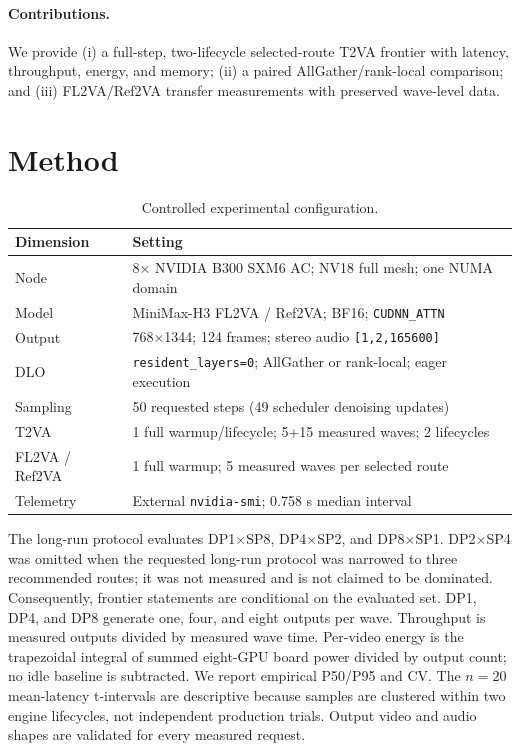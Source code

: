 \documentclass[10pt]{article}
\begin{document}
\paragraph{Contributions.}
We provide (i) a full-step, two-lifecycle selected-route T2VA frontier with
latency, throughput, energy, and memory; (ii) a paired AllGather/rank-local comparison;
and (iii) FL2VA/Ref2VA transfer measurements with preserved wave-level data.

\section{Method}

\begin{table}[ht]
\centering
\caption{Controlled experimental configuration.}
\label{tab:setup}
\small
\begin{tabular}{@{}ll@{}}
\toprule
Dimension & Setting \\
\midrule
Node & 8$\times$ NVIDIA B300 SXM6 AC; NV18 full mesh; one NUMA domain \\
Model & MiniMax-H3 FL2VA / Ref2VA; BF16; \texttt{CUDNN\_ATTN} \\
Output & 768$\times$1344; 124 frames; stereo audio \texttt{[1,2,165600]} \\
DLO & \texttt{resident\_layers=0}; AllGather or rank-local; eager execution \\
Sampling & 50 requested steps (49 scheduler denoising updates) \\
T2VA & 1 full warmup/lifecycle; 5+15 measured waves; 2 lifecycles \\
FL2VA / Ref2VA & 1 full warmup; 5 measured waves per selected route \\
Telemetry & External \texttt{nvidia-smi}; 0.758 s median interval \\
\bottomrule
\end{tabular}
\end{table}

The long-run protocol evaluates DP1$\times$SP8, DP4$\times$SP2, and
DP8$\times$SP1.  DP2$\times$SP4 was omitted when the requested long-run protocol
was narrowed to three recommended routes; it was not measured and is not
claimed to be dominated.  Consequently, frontier statements are conditional
on the evaluated set.  DP1, DP4, and DP8 generate one, four, and eight outputs
per wave.  Throughput
is measured outputs divided by measured wave time.  Per-video energy is the
trapezoidal integral of summed eight-GPU board power divided by output count;
no idle baseline is subtracted.  We report empirical P50/P95 and CV.
The $n=20$ mean-latency t-intervals are descriptive because samples are
clustered within two engine lifecycles, not independent production trials.
Output video and audio shapes are validated for every measured request.
\end{document}
